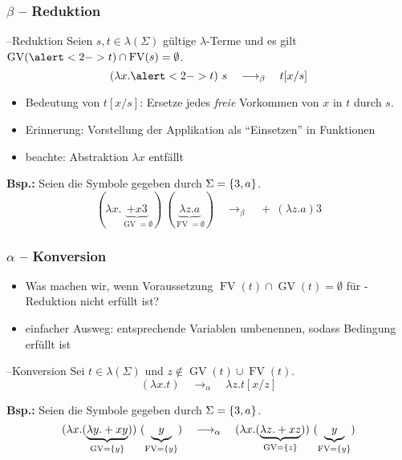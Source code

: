 \documentclass{beamer}
\DeclareMathOperator{\GV}{GV}
\DeclareMathOperator{\FV}{FV}
\begin{document}
\begin{frame} \frametitle{$\beta$ -- Reduktion}
	\footnotesize
	\begin{block}{\textbeta--Reduktion}
		Seien $s,t \in \lambda(\Sigma)$ gültige $\lambda$-Terme und es gilt $\GV(\alert<2->{t}) \cap \FV(s) = \emptyset$. 
		\begin{equation*}
			(\lambda x . \alert<2->{t}) \ s \quad \longrightarrow_\beta \quad t[x / s]
		\end{equation*}
	\end{block}
	
	\pause
	
	\begin{itemize}
		\item Bedeutung von $t[x / s]$: Ersetze jedes \textit{freie} Vorkommen von $x$ in $t$ durch $s$. 
		\item Erinnerung: Vorstellung der Applikation als \enquote{Einsetzen} in Funktionen
		\item beachte: Abstraktion $\lambda x$ entfällt
	\end{itemize}

	\pause
	
	\textbf{Bsp.:} Seien die Symbole gegeben durch $\Sigma = \left\{ 3,a \right\}$.
	\begin{equation*}
		(\lambda x . \underbrace{+ x 3}_{\GV = \emptyset}) \ (\underbrace{\lambda z . a}_{\FV = \emptyset}) \quad \longrightarrow_\beta \quad + \ (\lambda z . a) 3
	\end{equation*}
\end{frame}

\begin{frame} \frametitle{$\alpha$ -- Konversion }
	\footnotesize
	\begin{itemize}
		\item Was machen wir, wenn Voraussetzung $\FV(t) \cap \GV(t) = \emptyset$ für \textbeta-Reduktion nicht erfüllt ist?
		\item einfacher Ausweg: entsprechende Variablen umbenennen, sodass Bedingung erfüllt ist
	\end{itemize}

	\pause
	
	\begin{block}{\textalpha --Konversion}
		Sei $t \in \lambda(\Sigma)$ und $z \notin \GV(t) \cup \FV(t)$.
		\begin{equation*}
			(\lambda x . t) \quad \longrightarrow_\alpha \quad \lambda z . t[x / z]
		\end{equation*}
	\end{block}

	\pause
	
	\textbf{Bsp.:} Seien die Symbole gegeben durch $\Sigma = \left\{ 3,a \right\}$.
	\begin{equation*}
		(\lambda x . (\underbrace{\lambda y . + x y}_{\GV = \menge{y}})) \ (\underbrace{y}_{\FV = \menge{y}}) 
		\quad \longrightarrow_\alpha \quad 
		(\lambda x . (\underbrace{\lambda z . + x z}_{\GV = \menge{z}})) \ (\underbrace{y}_{\FV = \menge{y}})
	\end{equation*}
\end{frame}
\end{document}

